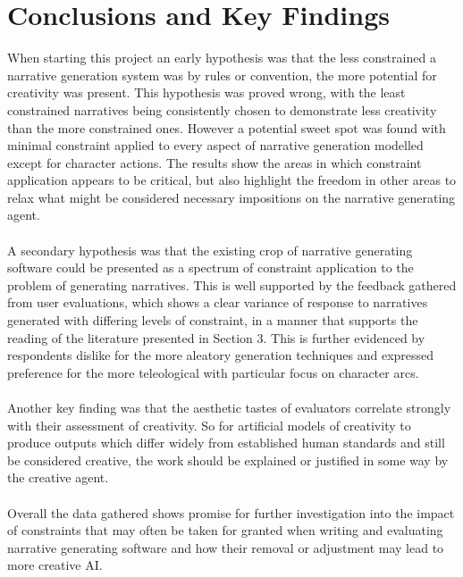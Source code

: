 \documentclass[letterpaper]{article}
\begin{document}
\section{Conclusions and Key Findings}
When starting this project an early hypothesis was that the less constrained a narrative generation system was by rules or convention, the more potential for creativity was present. This hypothesis was proved wrong, with the least constrained narratives being consistently chosen to demonstrate less creativity than the more constrained ones. However a potential sweet spot was found with minimal constraint applied to every aspect of narrative generation modelled except for character actions. The results show the areas in which constraint application appears to be critical, but also highlight the freedom in other areas to relax what might be considered necessary impositions on the narrative generating agent.\\
\\A secondary hypothesis was that the existing crop of narrative generating software could be presented as a spectrum of constraint application to the problem of generating narratives. This is well supported by the feedback gathered from user evaluations, which shows a clear variance of response to narratives generated with differing levels of constraint, in a manner that supports the reading of the literature presented in Section 3. This is further evidenced by respondents dislike for the more aleatory generation techniques and expressed preference for the more teleological with particular focus on character arcs.\\
\\Another key finding was that the aesthetic tastes of evaluators correlate strongly with their assessment of creativity. So for artificial models of creativity to produce outputs which differ widely from established human standards and still be considered creative, the work should be explained or justified in some way by the creative agent.\\
\\Overall the data gathered shows promise for further investigation into the impact of constraints that may often be taken for granted when writing and evaluating narrative generating software and how their removal or adjustment may lead to more creative AI. 


\end{document}
